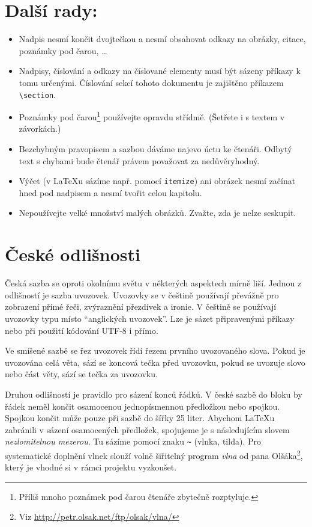 \documentclass[10pt,twocolumn]{article}
\begin{document}
\section{Další rady:} \label{3}
\begin{itemize}
    \item Nadpis nesmí končit dvojtečkou a nesmí obsahovat odkazy na obrázky, citace, poznámky pod čarou, \dots

    \item Nadpisy, číslování a odkazy na číslované elementy musí být sázeny příkazy k tomu určenými.
    Číslování sekcí tohoto dokumentu je zajištěno příkazem \texttt{\textbackslash section}.

    \item Poznámky pod čarou\footnote{Příliš mnoho poznámek pod čarou čtenáře zbytečně rozptyluje.} používejte opravdu střídmě.
    (Šetřete i s textem v závorkách.)

    \item Bezchybným pravopisem a sazbou dáváme najevo úctu ke čtenáři.
    Odbytý text s chybami bude čtenář právem považovat za nedůvěryhodný.

    \item Výčet (v \LaTeX u sázíme např. pomocí \texttt{itemize}) ani obrázek nesmí začínat hned pod nadpisem a nesmí tvořit celou kapitolu.

    \item Nepoužívejte velké množství malých obrázků.
    Zvažte, zda je nelze seskupit.
\end{itemize}

\section{České odlišnosti} \label{4}
Česká sazba se oproti okolnímu světu v některých aspektech mírně liší.
Jednou z odlišností je sazba uvozovek.
Uvozovky se v češtině používají převážně pro zobrazení přímé řeči, zvýraznění přezdívek a ironie.
V češtině se používají uvozovky typu  místo ``anglických uvozovek''.
Lze je sázet připravenými příkazy nebo při použití kódování UTF-8 i přímo.

Ve smíšené sazbě se řez uvozovek řídí řezem prvního uvozovaného slova.
Pokud je uvozována celá věta, sází se koncová tečka před uvozovku, pokud se uvozuje slovo nebo část věty, sází se tečka za uvozovku.

Druhou odlišností je pravidlo pro sázení konců řádků.
V české sazbě do bloku by řádek neměl končit osamocenou jednopísmennou předložkou nebo spojkou.
Spojkou  končit může pouze při sazbě do šířky 25 liter.
Abychom \LaTeX u zabránili v sázení osamocených předložek, spojujeme je s následujícím slovem {\itshape nezlomitelnou mezerou}.
Tu sázíme pomocí znaku \texttt{\textasciitilde} (vlnka, tilda).
Pro systematické doplnění vlnek slouží volně šiřitelný program {\itshape vlna} od pana Olšáka\footnote{Viz \url{http://petr.olsak.net/ftp/olsak/vlna/}}, který je vhodné si v rámci projektu vyzkoušet.
\end{document}
